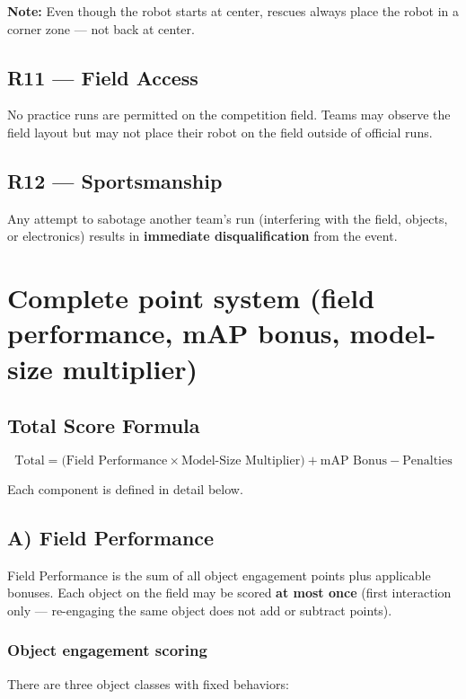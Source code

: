 \documentclass[a4]{article}
\begin{document}
\textbf{Note:} Even though the robot starts at center, rescues always place the robot in a corner zone --- not back at center.

\subsection*{R11 --- Field Access}
No practice runs are permitted on the competition field. Teams may observe the field layout but may not place their robot on the field outside of official runs.

\subsection*{R12 --- Sportsmanship}
Any attempt to sabotage another team's run (interfering with the field, objects, or electronics) results in \textbf{immediate disqualification} from the event.

\section*{Complete point system (field performance, mAP bonus, model-size multiplier)}
\subsection*{Total Score Formula}

\begin{equation*}
\boxed{\text{Total} = \bigl(\text{Field Performance} \times \text{Model-Size Multiplier}\bigr) + \text{mAP Bonus} - \text{Penalties}}
\end{equation*}

Each component is defined in detail below.

\subsection*{A) Field Performance}

Field Performance is the sum of all object engagement points plus applicable bonuses. Each object on the field may be scored \textbf{at most once} (first interaction only --- re-engaging the same object does not add or subtract points).

\subsubsection*{Object engagement scoring}

There are three object classes with fixed behaviors:
\end{document}
